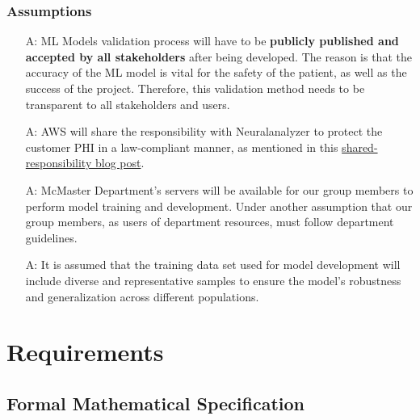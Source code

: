 \documentclass[12pt]{article}
\newcounter{assumpnum} %
\begin{document}
\subsubsection{Assumptions} \label{sec_assumpt}
\begin{itemize}

\item[A\refstepcounter{assumpnum}\theassumpnum \label{A_meaningfulLabel}:] ML Models validation process will have to be \textbf{publicly published and accepted by all stakeholders} after being developed. The reason is that the accuracy of the ML model is vital for the safety of the patient, as well as the success of the project. Therefore, this validation method needs to be transparent to all stakeholders and users.

\item[A\refstepcounter{assumpnum}\theassumpnum \label{A_meaningfulLabel}:] AWS will share the responsibility with Neuralanalyzer to protect the customer PHI in a law-compliant manner, as mentioned in this \href{https://docs.aws.amazon.com/whitepapers/latest/aws-risk-and-compliance/shared-responsibility-model.html}{shared-responsibility blog post}.

\item[A\refstepcounter{assumpnum}\theassumpnum \label{A_meaningfulLabel}:] McMaster Department's servers will be available for our group members to perform model training and development. Under another assumption that our group members, as users of department resources, must follow department guidelines.

\item[A\refstepcounter{assumpnum}\theassumpnum \label{A_meaningfulLabel}:] It is assumed that the training data set used for model development will include diverse and representative samples to ensure the model’s robustness and generalization across different populations.
\end{itemize}

  \clearpage
\section{Requirements}
\subsection{Formal Mathematical Specification}
\end{document}
